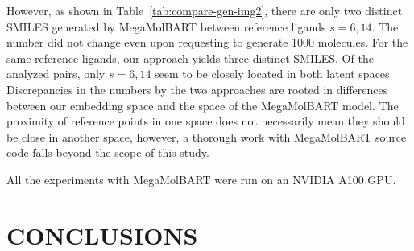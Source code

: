 \documentclass[12pt]{article}
\begin{document}
However, as shown in Table~\ref{tab:compare-gen-img2}, there are only two distinct SMILES generated by MegaMolBART between reference ligands $s=6,14$.
The number did not change even upon requesting to generate 1000 molecules. 
For the same reference ligands, our approach yields three distinct SMILES.
Of the analyzed pairs, only $s=6,14$ seem to be closely located in both latent spaces.
Discrepancies in the numbers by the two approaches are rooted in differences between our embedding space and the space of the MegaMolBART model.
The proximity of reference points in one space does not necessarily mean they should be close in another space, however, a thorough work with MegaMolBART source code falls beyond the scope of this study.

All the experiments with MegaMolBART
were run on an NVIDIA A100 GPU.


\section*{\sffamily \Large CONCLUSIONS}
\label{sec:Conclusions}
\end{document}
